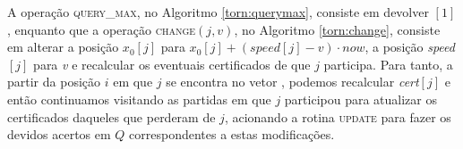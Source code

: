 



A operação \textsc{query\_max}, no Algoritmo \ref{torn:querymax},
consiste em devolver \torneio$[1]$, enquanto que a operação
\textsc{change}$(j, v)$, no Algoritmo \ref{torn:change}, consiste em
alterar a posição $x_0[j]$ para ${x_0[j] + (\mathit{speed}[j] -
v)\cdot now}$, a posição \textit{speed}$[j]$ para \textit{v} e
recalcular os eventuais certificados de que $j$ participa. Para
tanto, a partir da posição $i$ em que $j$ se encontra no vetor
\torneio, podemos recalcular \textit{cert}$[j]$ e então continuamos
visitando as partidas em que $j$ participou para atualizar os
certificados daqueles que perderam de $j$, acionando a rotina
\textsc{update} para fazer os devidos acertos em $Q$ correspondentes
a estas modificações.







